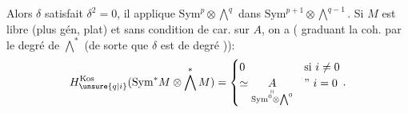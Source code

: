 Alors $\delta$ satisfait $\delta^2=0$, il applique $\mathrm{Sym}^{p}\otimes\bigwedge^{q}$ dans $\mathrm{Sym}^{p+1}\otimes\bigwedge^{q-1}$. Si $M$ est libre (plus gén, plat) et sans condition de car. sur $A$, on a ( graduant la coh. par le degré de $\bigwedge^{\ast}$ 
(de sorte que $\delta$ est de degré )):
\[
H^{\mathrm{Kos}}_{\unsure{q|i}}(\mathrm{Sym}^{\ast}M\otimes\bigwedge^\ast M)=
\begin{cases}0&\text{si }i\ne0\\
\simeq\underset{\substack{\shortparallel\\[-2pt]\mathrm{Sym}^{0}\otimes\bigwedge^{0}}}{A}&\text{'' }i=0\end{cases}.
\]
